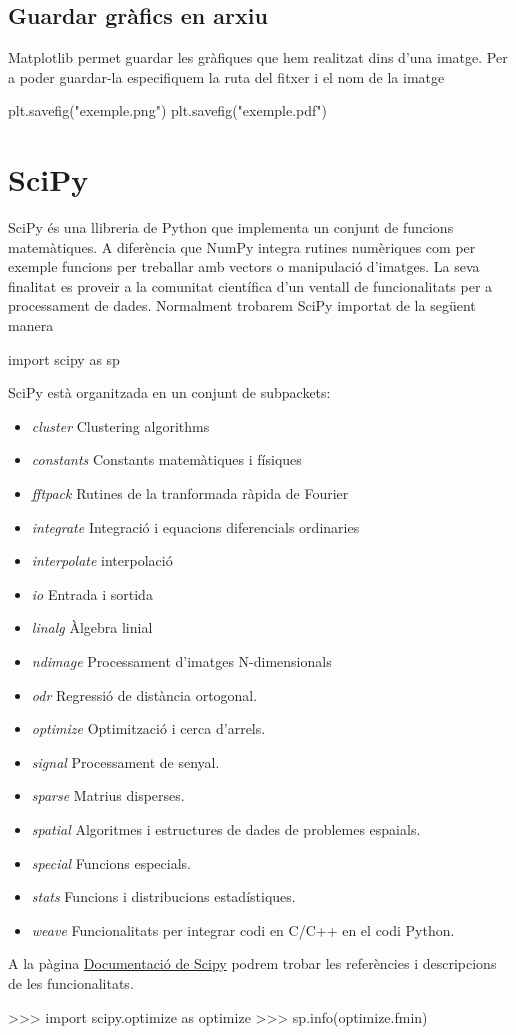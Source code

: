 \subsection{Guardar gràfics en arxiu}
Matplotlib permet guardar les gràfiques que hem realitzat dins d'una imatge. Per a poder guardar-la especifiquem la ruta del fitxer i el nom de la imatge
\begin{blockcode}
plt.savefig("exemple.png")
plt.savefig("exemple.pdf")
\end{blockcode}
\section{SciPy}
SciPy és una llibreria de Python que implementa un conjunt de funcions matemàtiques. A diferència que NumPy integra rutines numèriques com per exemple funcions per treballar amb vectors  o manipulació d'imatges. La seva finalitat es proveir a la comunitat científica d'un ventall de funcionalitats per a processament de dades. Normalment trobarem SciPy importat de la següent manera
\begin{blockcode}
import scipy as sp
\end{blockcode}
SciPy està organitzada en un conjunt de subpackets:
\begin{itemize}
\item \emph{cluster} Clustering algorithms
\item \emph{constants} Constants matemàtiques i físiques
\item \emph{fftpack} Rutines de la tranformada ràpida de Fourier
\item \emph{integrate} Integració i equacions diferencials ordinaries
\item \emph{interpolate} interpolació
\item \emph{io} Entrada i sortida
\item \emph{linalg} Àlgebra linial
\item \emph{ndimage} Processament d'imatges N-dimensionals
\item \emph{odr} Regressió de distància ortogonal.
\item \emph{optimize} Optimització i cerca d'arrels.
\item \emph{signal} Processament de senyal.
\item \emph{sparse} Matrius disperses.
\item \emph{spatial} Algoritmes i estructures de dades de problemes espaials.
\item \emph{special} Funcions especials.
\item \emph{stats} Funcions i distribucions estadístiques.
\item \emph{weave} Funcionalitats per integrar codi en C/C++ en el codi Python.
\end{itemize}
A la pàgina \href{http://docs.scipy.org/doc/scipy/reference/tutorial/}{Documentació de Scipy} podrem trobar les referències i descripcions de les funcionalitats.
\begin{blockcode}
>>> import scipy.optimize as optimize
>>> sp.info(optimize.fmin)
\end{blockcode}
